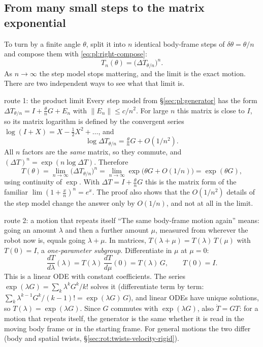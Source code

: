 \subsection{From many small steps to the matrix exponential}\label{sec:pl:exponential-limit}

To turn by a finite angle $\theta$, split it into $n$ identical body-frame steps of $\delta\theta=\theta/n$ and compose them with \eqref{eq:pl:right-compose}:
\[
T_n(\theta)=\big(\Delta T_{\theta/n}\big)^n .
\]
As $n\to\infty$ the step model stops mattering, and the limit is the exact motion. There are two independent ways to see what that limit is.

\begin{deriv}{route 1: the product limit}
Every step model from \S\ref{sec:pl:generator} has the form $\Delta T_{\theta/n}=I+\frac{\theta}{n}G+E_n$ with $\|E_n\|\le c/n^2$. For large $n$ this matrix is close to $I$, so its matrix logarithm is defined by the convergent series $\log(I+X)=X-\tfrac12X^2+\dots$, and
\[
\log\Delta T_{\theta/n}=\tfrac{\theta}{n}G+O(1/n^2).
\]
All $n$ factors are the \emph{same} matrix, so they commute, and $(\Delta T)^n=\exp(n\log\Delta T)$. Therefore
\[
T(\theta)=\lim_{n\to\infty}\big(\Delta T_{\theta/n}\big)^n=\lim_{n\to\infty}\exp\!\big(\theta G+O(1/n)\big)=\exp(\theta G),
\]
using continuity of $\exp$. With $\Delta T=I+\frac\theta nG$ this is the matrix form of the familiar $\lim(1+\frac xn)^n=e^x$. The proof also shows that the $O(1/n^2)$ details of the step model change the answer only by $O(1/n)$, and not at all in the limit.
\end{deriv}

\begin{deriv}{route 2: a motion that repeats itself}
``The same body-frame motion again'' means: going an amount $\lambda$ and then a further amount $\mu$, measured from wherever the robot now is, equals going $\lambda+\mu$. In matrices, $T(\lambda+\mu)=T(\lambda)\,T(\mu)$ with $T(0)=I$, a \emph{one-parameter subgroup}. Differentiate in $\mu$ at $\mu=0$:
\[
\frac{dT}{d\lambda}(\lambda)=T(\lambda)\,\frac{dT}{d\mu}(0)=T(\lambda)\,G,\qquad T(0)=I.
\]
This is a linear ODE with constant coefficients. The series $\exp(\lambda G)=\sum_k\lambda^kG^k/k!$ solves it (differentiate term by term: $\sum_k\lambda^{k-1}G^k/(k-1)!=\exp(\lambda G)\,G$), and linear ODEs have unique solutions, so $T(\lambda)=\exp(\lambda G)$. Since $G$ commutes with $\exp(\lambda G)$, also $\dot T=GT$: for a motion that repeats itself, the generator is the same whether it is read in the moving body frame or in the starting frame. For general motions the two differ (body and spatial twists, \S\ref{sec:rot:twists-velocity-rigid}).
\end{deriv}

